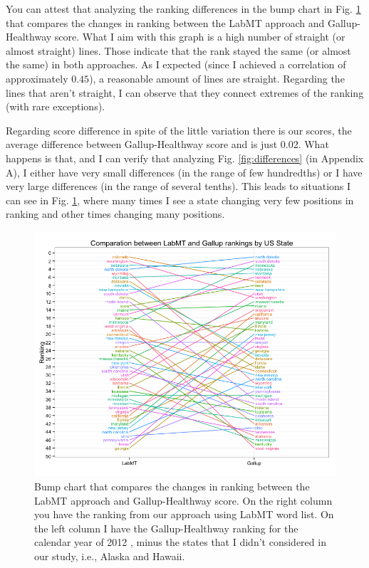 \documentclass{llncs}
\begin{document}
You can attest that analyzing the ranking differences in the bump chart in Fig. \ref{fig:bump_chart} that compares the changes in ranking between the LabMT approach and Gallup-Healthway score. What I aim with this graph is a high number of straight (or almost straight) lines. Those indicate that the rank stayed the same (or almost the same) in both approaches. As I expected (since I achieved a correlation of approximately $0.45$), a reasonable amount of lines are straight. Regarding the lines that aren't straight, I can observe that they connect extremes of the ranking (with rare exceptions).

Regarding score difference in spite of the little variation there is our scores, the average difference between Gallup-Healthway score and is just 0.02. What happens is that, and I can verify that analyzing Fig. \ref{fig:differences} (in Appendix A), I either have very small differences (in the range of few hundredths) or I have very large differences (in the range of several tenths). This leads to situations I can see in Fig. \ref{fig:bump_chart}, where many times I see a state changing very few positions in ranking and other times changing many positions.

\begin{figure}
\centering
\includegraphics[width=\textwidth]{images/bump_chart}
\caption{Bump chart that compares the changes in ranking between the LabMT approach and Gallup-Healthway score. On the right column you have the ranking from our approach using LabMT word list. On the left column I have the Gallup-Healthway ranking for the calendar year of 2012 \cite{GallupHealthway2013}, minus the states that I didn't considered in our study, i.e., Alaska and Hawaii.}
\label{fig:bump_chart}
\end{figure}
\end{document}
